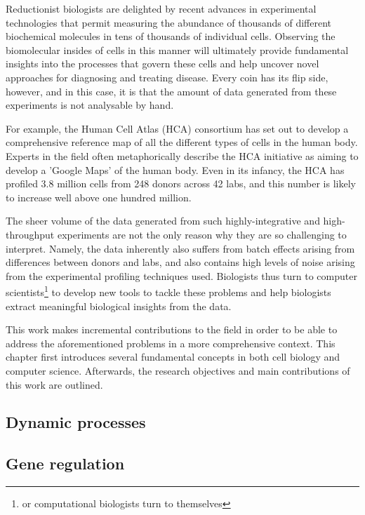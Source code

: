 Reductionist biologists are delighted by recent advances in experimental technologies that permit measuring the abundance of thousands of different biochemical molecules in tens of thousands of individual cells.  Observing the biomolecular insides of cells in this manner will ultimately provide fundamental insights into the processes that govern these cells and help uncover novel approaches for diagnosing and treating disease. Every coin has its flip side, however, and in this case, it is that the amount of data generated from these experiments is not analysable by hand.  

For example, the Human Cell Atlas (HCA) consortium\cite{regev_humancellatlas_2018} has set out to develop a comprehensive reference map of all the different types of cells in the human body. Experts in the field often metaphorically describe the HCA initiative as aiming to develop a 'Google Maps' of the human body. Even in its infancy, the HCA has profiled 3.8 million cells from 248 donors across 42 labs\cite{humancellatlasconsortium_humancellatlas_2018}, and this number is likely to increase well above one hundred million.

The sheer volume of the data generated from such highly-integrative and high-throughput experiments are not the only reason why they are so challenging to interpret. Namely, the data inherently also suffers from batch effects arising from differences between donors and labs, and also contains high levels of noise arising from the experimental profiling techniques used\cite{hon_humancellatlas_2018}. Biologists thus turn to computer scientists\footnote{or computational biologists turn to themselves} to develop new tools to tackle these problems and help biologists extract meaningful biological insights from the data.

This work makes incremental contributions to the field in order to be able to address the aforementioned problems in a more comprehensive context. This chapter first introduces several fundamental concepts in both cell biology and computer science. Afterwards, the research objectives and main contributions of this work are outlined.




\subsection{Dynamic processes}

\subsection{Gene regulation}

